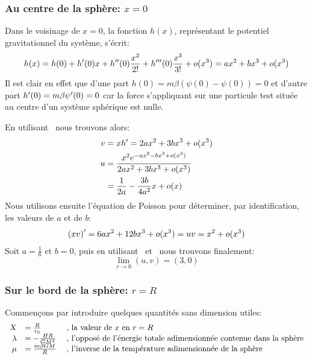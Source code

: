 
\subsubsection{Au centre de la sphère: $x = 0$}
	Dans le voisinage de $x=0$, la fonction $h(x)$, représentant le potentiel gravitationnel du système, s'écrit:
	\begin{align*}
		h(x) = h(0) + h'(0)x + h^{\prime\prime}(0)\frac{x^2}{2!} + h^{\prime\prime\prime}(0)\frac{x^3}{3!} + o(x^3) = ax^2 + bx^3 + o(x^3)
	\end{align*}
	Il est clair en effet que d'une part \mbox{$h(0) = m\beta\left(\psi(0) - \psi(0)\right) = 0$} et d'autre part \mbox{$h'(0) = m\beta\psi'(0) = 0$} car la force s'appliquant sur une particule test située au centre d'un système sphérique est nulle.

	En utilisant~ nous trouvons alors:
	\begin{align}
		v &= xh' = 2ax^2 + 3bx^3 + o(x^3)\label{vDL} \\
		u &= \frac{x^2e^{-ax^2 - bx^3 + o(x^3)}}{2ax^2 + 3bx^3 + o(x^3)} \\
		  &= \frac{1}{2a} - \frac{3b}{4a^2}x + o(x)\label{uDL}
	\end{align}
	Nous utilisons ensuite l'équation de Poisson pour déterminer, par identification, les valeurs de $a$ et de $b$:
	\begin{align}
		\left(xv\right)' = 6ax^2 + 12bx^3 + o(x^3) = uv = x^2 + o(x^3)\label{PoisDL}
	\end{align}
	Soit $a = \frac{1}{6}$ et $b=0$, puis en utilisant~ et~ nous trouvons finalement:
	$$\lim_{r\to 0}(u,v) = (3,0)$$

\subsubsection{Sur le bord de la sphère: $r = R$}
	Commençons par introduire quelques quantités sans dimension utiles: %
	\begin{align}
		\begin{array}{rll}
		X &= \frac{R}{r_0}\;   &\textrm{, la valeur de }x\textrm{ en }r=R \\
		\lambda &= - \frac{H R}{G M^2}\;   &\textrm{, l'opposé de l'énergie totale adimensionnée contenue dans la sphère}\\
		\mu &= \frac{m\beta GM}{R}\;    &\textrm{, l'inverse de la température adimensionnée de la sphère}
		\end{array} \notag
	\end{align}
	
